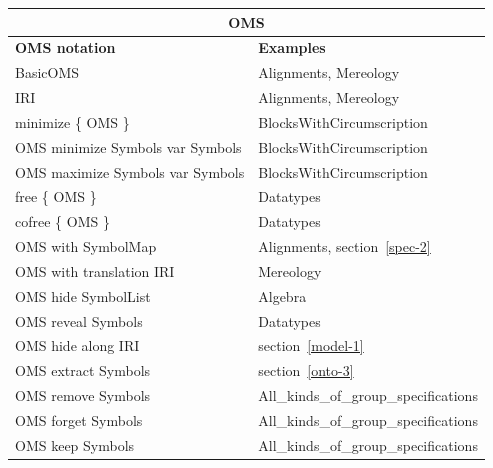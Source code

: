 \documentclass[10pt,fleqn,final]{scrreprt}
\begin{document}
\begin{tabular}{|l|l|}\hline
\multicolumn{2}{|c|}{\textbf{OMS}}\\\hline
\textbf{OMS notation} & \textbf{Examples} \\\hline
BasicOMS  & Alignments, Mereology \\\hline
IRI  & Alignments, Mereology \\\hline
minimize \{ OMS \}  & BlocksWithCircumscription \\\hline
OMS minimize Symbols var Symbols  & BlocksWithCircumscription \\\hline
OMS maximize Symbols var Symbols  & BlocksWithCircumscription \\\hline
free \{ OMS \} & Datatypes \\\hline
cofree \{ OMS \} & Datatypes \\\hline
OMS with SymbolMap  & Alignments,  section~\ref{spec-2} \\\hline
OMS with translation IRI  & Mereology \\\hline
OMS hide SymbolList  &  Algebra \\\hline
OMS reveal Symbols  & Datatypes \\\hline
OMS hide along IRI  & section~\ref{model-1} \\\hline
OMS extract Symbols  & section~\ref{onto-3} \\\hline
OMS remove Symbols  & All\_kinds\_of\_group\_specifications \\\hline
OMS forget Symbols  & All\_kinds\_of\_group\_specifications \\\hline
OMS keep Symbols  & All\_kinds\_of\_group\_specifications \\\hline

\end{tabular}
\end{document}
